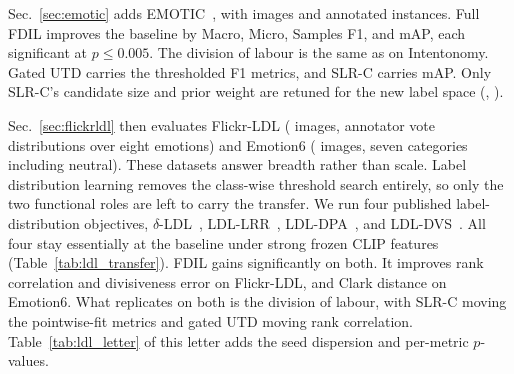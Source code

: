 
{

 Sec.~\ref{sec:emotic} adds EMOTIC~\cite{kosti_context_2019}, with  images and  annotated instances. Full FDIL improves the baseline by  Macro,  Micro,  Samples F1, and  mAP, each significant at $p\le0.005$. The division of labour is the same as on Intentonomy. Gated UTD carries the thresholded F1 metrics, and SLR-C carries mAP. Only SLR-C's candidate size and prior weight are retuned for the new label space (, ).

 Sec.~\ref{sec:flickrldl} then evaluates Flickr-LDL ( images, annotator vote distributions over eight emotions) and Emotion6 ( images, seven categories including neutral). These datasets answer breadth rather than scale. Label distribution learning removes the class-wise threshold search entirely, so only the two functional roles are left to carry the transfer. We run four published label-distribution objectives, $\delta$-LDL~\cite{li_approximately_2025}, LDL-LRR~\cite{jia_label_2023}, LDL-DPA~\cite{jia_adaptive_2024}, and LDL-DVS~\cite{lu2026divisiveness}. All four stay essentially at the baseline under strong frozen CLIP features (Table~\ref{tab:ldl_transfer}). FDIL gains significantly on both. It improves rank correlation and divisiveness error on Flickr-LDL, and Clark distance on Emotion6. What replicates on both is the division of labour, with SLR-C moving the pointwise-fit metrics and gated UTD moving rank correlation. Table~\ref{tab:ldl_letter} of this letter adds the seed dispersion and per-metric $p$-values.
}

